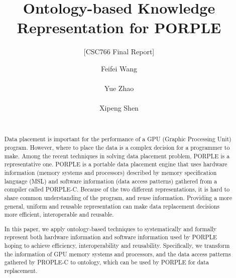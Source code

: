 \documentclass{sig-alternate}
\begin{document}

\title{Ontology-based Knowledge Representation for PORPLE}
\subtitle{[CSC766 Final Report]}

\author{
\alignauthor
Feifei Wang\\
       \\
\alignauthor
Yue Zhao\\
       \\
\alignauthor
Xipeng Shen\\
       \\
}
\maketitle
\begin{abstract}
Data placement is important for the performance of a GPU (Graphic Processing Unit) program. However, where to place the data is a complex decision for a programmer to make. Among the recent techniques in solving data placement problem, PORPLE is a representative one. PORPLE is a portable data placement engine that uses hardware information (memory systems and processors) described by memory specification language (MSL) and software information (data access patterns) gathered from a compiler called PORPLE-C. Because of the two different representations, it is hard to share common understanding of the program, and reuse information. Providing a more general, uniform and reusable representation can make data replacement decisions more efficient, interoperable and reusable.

In this paper, we apply ontology-based techniques to systematically and formally represent both hardware information and software information used by PORPLE hoping to achieve efficiency, interoperability and reusability. Specifically, we transform the information of GPU memory systems and processors, and the data access patterns gathered by PROPLE-C to ontology, which can be used by PORPLE for data replacement.
 
\end{abstract}


\end{document}

